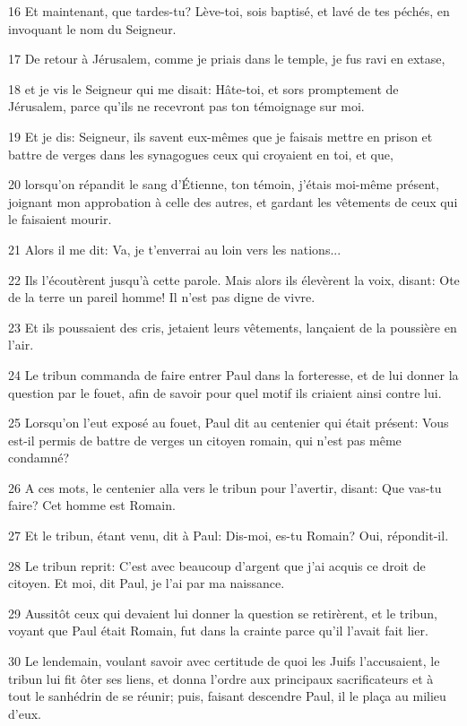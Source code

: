 \par 16 Et maintenant, que tardes-tu? Lève-toi, sois baptisé, et lavé de tes péchés, en invoquant le nom du Seigneur.
\par 17 De retour à Jérusalem, comme je priais dans le temple, je fus ravi en extase,
\par 18 et je vis le Seigneur qui me disait: Hâte-toi, et sors promptement de Jérusalem, parce qu'ils ne recevront pas ton témoignage sur moi.
\par 19 Et je dis: Seigneur, ils savent eux-mêmes que je faisais mettre en prison et battre de verges dans les synagogues ceux qui croyaient en toi, et que,
\par 20 lorsqu'on répandit le sang d'Étienne, ton témoin, j'étais moi-même présent, joignant mon approbation à celle des autres, et gardant les vêtements de ceux qui le faisaient mourir.
\par 21 Alors il me dit: Va, je t'enverrai au loin vers les nations...
\par 22 Ils l'écoutèrent jusqu'à cette parole. Mais alors ils élevèrent la voix, disant: Ote de la terre un pareil homme! Il n'est pas digne de vivre.
\par 23 Et ils poussaient des cris, jetaient leurs vêtements, lançaient de la poussière en l'air.
\par 24 Le tribun commanda de faire entrer Paul dans la forteresse, et de lui donner la question par le fouet, afin de savoir pour quel motif ils criaient ainsi contre lui.
\par 25 Lorsqu'on l'eut exposé au fouet, Paul dit au centenier qui était présent: Vous est-il permis de battre de verges un citoyen romain, qui n'est pas même condamné?
\par 26 A ces mots, le centenier alla vers le tribun pour l'avertir, disant: Que vas-tu faire? Cet homme est Romain.
\par 27 Et le tribun, étant venu, dit à Paul: Dis-moi, es-tu Romain? Oui, répondit-il.
\par 28 Le tribun reprit: C'est avec beaucoup d'argent que j'ai acquis ce droit de citoyen. Et moi, dit Paul, je l'ai par ma naissance.
\par 29 Aussitôt ceux qui devaient lui donner la question se retirèrent, et le tribun, voyant que Paul était Romain, fut dans la crainte parce qu'il l'avait fait lier.
\par 30 Le lendemain, voulant savoir avec certitude de quoi les Juifs l'accusaient, le tribun lui fit ôter ses liens, et donna l'ordre aux principaux sacrificateurs et à tout le sanhédrin de se réunir; puis, faisant descendre Paul, il le plaça au milieu d'eux.

